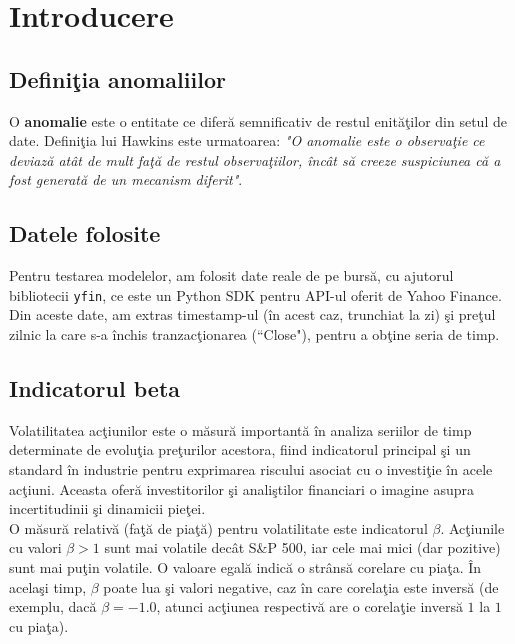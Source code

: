 \chapter{Introducere}

\section{Definiţia anomaliilor}

O \textbf{anomalie} este o entitate ce diferă semnificativ de restul enităţilor din 
setul de date. Definiţia lui Hawkins este urmatoarea\cite{hawkins1980identification}:
\textit{"O anomalie este o observaţie ce deviază atât de mult faţă de restul observaţiilor,
încât să creeze suspiciunea că a fost generată de un mecanism diferit"}.

\section{Datele folosite}

\noindent Pentru testarea modelelor, am folosit date reale de pe burs\u a, cu ajutorul bibliotecii \texttt{yfin}, ce este un Python SDK pentru API-ul oferit de Yahoo Finance. Din aceste date, am extras timestamp-ul (\^ in acest caz, trunchiat la zi) \c si pre\c tul zilnic la care s-a \^ inchis tranzac\c tionarea (``Close"), pentru a ob\c tine seria de timp. \\

\section{Indicatorul beta}

Volatilitatea ac\c tiunilor este o m\u asur\u a important\u a \^ in analiza seriilor de timp determinate de evolu\c tia pre\c turilor acestora, fiind indicatorul principal \c si un standard \^ in industrie pentru exprimarea riscului asociat cu o investi\c tie \^ in acele ac\c tiuni. Aceasta ofer\u a investitorilor \c si anali\c stilor financiari o imagine asupra incertitudinii \c si dinamicii pie\c tei. \\ 

O m\u asur\u a relativ\u a (fa\c t\u a de pia\c t\u a) pentru volatilitate este indicatorul $\beta$. Ac\c tiunile cu valori $\beta > 1$ sunt mai volatile dec\^ at S\&P 500, iar cele mai mici (dar pozitive) sunt mai pu\c tin volatile. O valoare egal\u a indic\u a o str\^ ans\u a corelare cu pia\c ta. \^ In acela\c si timp, $\beta$ poate lua \c si valori negative, caz \^ in care corela\c tia este invers\u a (de exemplu, dac\u a $\beta = -1.0$, atunci ac\c tiunea respectiv\u a are o corela\c tie invers\u a $1$ la $1$ cu pia\c ta). \cite{investopedia_beta} \\

